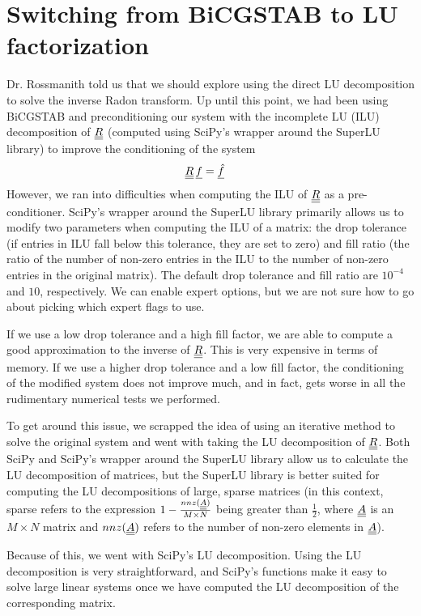 
\section*{Switching from BiCGSTAB to LU factorization}
Dr. Rossmanith told us that we should explore using the direct LU decomposition to solve the inverse Radon transform.
Up until this point, we had been using BiCGSTAB and preconditioning our system with the incomplete LU (ILU) decomposition of ${\underline{\underline{R}}}$ (computed using SciPy's wrapper around the SuperLU library) to improve the conditioning of the system
\begin{align*}
	{\underline{\underline{R}}} \, {\underline{f}} & = {\underline{\hat{f}}}
\end{align*}
However, we ran into difficulties when computing the ILU of ${\underline{\underline{R}}}$ as a pre-conditioner.
SciPy's wrapper around the SuperLU library primarily allows us to modify two parameters when computing the ILU of a matrix: the drop tolerance (if entries in ILU fall below this tolerance, they are set to zero) and fill ratio (the ratio of the number of non-zero entries in the ILU to the number of non-zero entries in the original matrix).
The default drop tolerance and fill ratio are $10^{-4}$ and $10$, respectively.
We can enable expert options, but we are not sure how to go about picking which expert flags to use.
\par 
If we use a low drop tolerance and a high fill factor, we are able to compute a good approximation to the inverse of ${\underline{\underline{R}}}$. 
This is very expensive in terms of memory.
If we use a higher drop tolerance and a low fill factor, the conditioning of the modified system does not improve much, and in fact, gets worse in all the rudimentary numerical tests we performed.
\par 
To get around this issue, we scrapped the idea of using an iterative method to solve the original system and went with taking the LU decomposition of ${\underline{\underline{R}}}$.
Both SciPy and SciPy's wrapper around the SuperLU library allow us to calculate the LU decomposition of matrices, but the SuperLU library is better suited for computing the LU decompositions of large, sparse matrices (in this context, sparse refers to the expression $1 - \frac{nnz({\underline{\underline{A}}})}{M \times N}$ being greater than $\frac{1}{2}$, where ${\underline{\underline{A}}}$ is an $M \times N$ matrix and $nnz({\underline{\underline{A}}})$ refers to the number of non-zero elements in ${\underline{\underline{A}}}$).
\par
Because of this, we went with SciPy's LU decomposition.
Using the LU decomposition is very straightforward, and SciPy's functions make it easy to solve large linear systems once we have computed the LU decomposition of the corresponding matrix.
